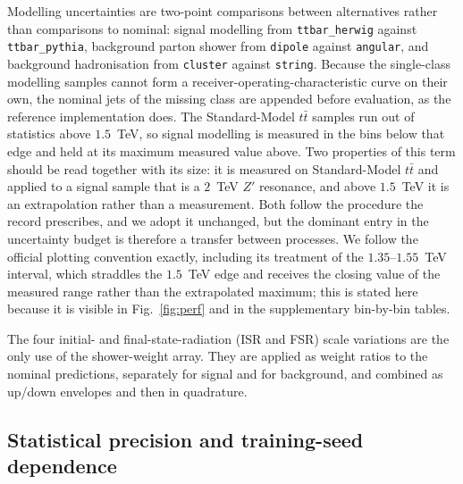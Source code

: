 \documentclass[pdflatex,sn-mathphys,Numbered,iicol]{sn-jnl}
\begin{document}
Modelling uncertainties are two-point comparisons between alternatives rather than
comparisons to nominal: signal modelling from \texttt{ttbar\_herwig} against
\texttt{ttbar\_pythia}, background parton shower from \texttt{dipole} against
\texttt{angular}, and background hadronisation from \texttt{cluster} against
\texttt{string}. Because the single-class modelling samples cannot form a
receiver-operating-characteristic curve on their own, the nominal jets of the missing
class are appended before evaluation, as the reference implementation does. The
Standard-Model $t\bar t$ samples run out of statistics above $1.5$~TeV, so signal
modelling is measured in the bins below that edge and held at its maximum measured
value above. Two properties of this term should be read together with its size: it is
measured on Standard-Model $t\bar t$ and applied to a signal sample that is a
$2$~TeV $Z'$ resonance, and above $1.5$~TeV it is an extrapolation rather than a
measurement. Both follow the procedure the record prescribes, and we adopt it
unchanged, but the dominant entry in the uncertainty budget is therefore a transfer
between processes. We follow the official plotting convention exactly, including its
treatment of the $1.35$--$1.55$~TeV interval, which straddles the $1.5$~TeV edge and
receives the closing value of the measured range rather than the extrapolated maximum;
this is stated here because it is visible in Fig.~\ref{fig:perf} and in the
supplementary bin-by-bin tables.

The four initial- and final-state-radiation (ISR and FSR) scale variations are the
only use of the shower-weight array. They are applied as weight ratios to the nominal predictions,
separately for signal and for background, and combined as up/down envelopes and then in
quadrature.

\subsection{Statistical precision and training-seed dependence}
\label{sec:precision}
\end{document}
